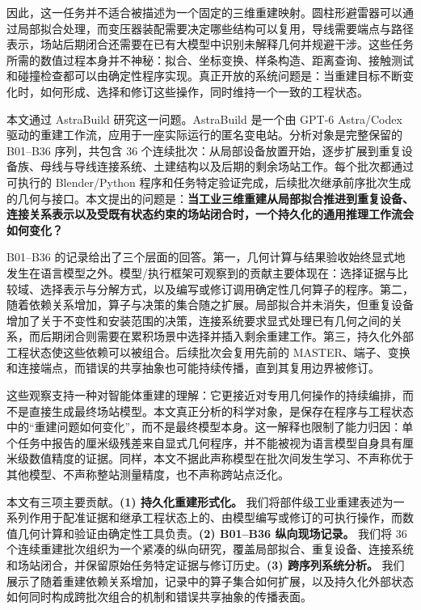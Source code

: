 \documentclass[10pt,a4paper]{article}
\begin{document}
因此，这一任务并不适合被描述为一个固定的三维重建映射。圆柱形避雷器可以通过局部拟合处理，而变压器装配需要决定哪些结构可以复用，导线需要端点与路径表示，场站后期闭合还需要在已有大模型中识别未解释几何并规避干涉。这些任务所需的数值过程本身并不神秘：拟合、坐标变换、样条构造、距离查询、接触测试和碰撞检查都可以由确定性程序实现。真正开放的系统问题是：当重建目标不断变化时，如何形成、选择和修订这些操作，同时维持一个一致的工程状态。

本文通过 AstraBuild 研究这一问题。AstraBuild 是一个由 GPT-6 Astra/Codex
驱动的重建工作流，应用于一座实际运行的匿名变电站。分析对象是完整保留的
B01--B36 序列，共包含 36
个连续批次：从局部设备放置开始，逐步扩展到重复设备族、母线与导线连接系统、土建结构以及后期的剩余场站工作。每个批次都通过可执行的
Blender/Python
程序和任务特定验证完成，后续批次继承前序批次生成的几何与接口。本文提出的问题是：\textbf{当工业三维重建从局部拟合推进到重复设备、连接关系表示以及受既有状态约束的场站闭合时，一个持久化的通用推理工作流会如何变化？}

B01--B36
的记录给出了三个层面的回答。第一，几何计算与结果验收始终显式地发生在语言模型之外。模型/执行框架可观察到的贡献主要体现在：选择证据与比较域、选择表示与分解方式，以及编写或修订调用确定性几何算子的程序。第二，随着依赖关系增加，算子与决策的集合随之扩展。局部拟合并未消失，但重复设备增加了关于不变性和安装范围的决策，连接系统要求显式处理已有几何之间的关系，而后期闭合则需要在累积场景中选择并插入剩余重建工作。第三，持久化外部工程状态使这些依赖可以被组合。后续批次会复用先前的
MASTER、端子、变换和连接端点，而错误的共享抽象也可能持续传播，直到其复用边界被修订。

这些观察支持一种对智能体重建的理解：它更接近对专用几何操作的持续编排，而不是直接生成最终场站模型。本文真正分析的科学对象，是保存在程序与工程状态中的``重建问题如何变化''，而不是最终模型本身。这一解释也限制了能力归因：单个任务中报告的厘米级残差来自显式几何程序，并不能被视为语言模型自身具有厘米级数值精度的证据。同样，本文不据此声称模型在批次间发生学习、不声称优于其他模型、不声称整站测量精度，也不声称跨站点泛化。

本文有三项主要贡献。\textbf{(1) 持久化重建形式化。}
我们将部件级工业重建表述为一系列作用于配准证据和继承工程状态上的、由模型编写或修订的可执行操作，而数值几何计算和验证由确定性工具负责。\textbf{(2)
B01--B36 纵向现场记录。} 我们将 36
个连续重建批次组织为一个紧凑的纵向研究，覆盖局部拟合、重复设备、连接系统和场站闭合，并保留原始任务特定证据与修订历史。\textbf{(3)
跨序列系统分析。}
我们展示了随着重建依赖关系增加，记录中的算子集合如何扩展，以及持久化外部状态如何同时构成跨批次组合的机制和错误共享抽象的传播表面。
\end{document}
